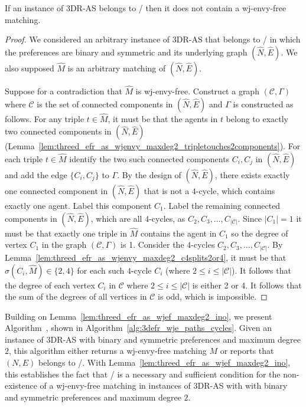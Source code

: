 \begin{lem}
\label{lem:threed_efr_as_wjef_maxdeg2_ino}
If an instance of 3DR-AS belongs to \iwjnomaxdegreetwofamily/ then it does not contain a wj-envy-free matching.
\end{lem}
\begin{proof}
We considered an arbitrary instance of 3DR-AS that belongs to \iwjnomaxdegreetwofamily/ in which the preferences are binary and symmetric and its underlying graph $(\hat{N}, \hat{E})$. We also supposed $\hat{M}$ is an arbitrary matching of $(\hat{N}, \hat{E})$.

Suppose for a contradiction that $\hat{M}$ is wj-envy-free. Construct a graph $(\mathcal{C}, \Gamma)$ where $\mathcal{C}$ is the set of connected components in $(\hat{N}, \hat{E})$ and $\Gamma$ is constructed as follows. For any triple $t \in \hat{M}$, it must be that the agents in $t$ belong to exactly two connected components in $(\hat{N}, \hat{E})$ (Lemma~\ref{lem:threed_efr_as_wjenvy_maxdeg2_tripletouches2components}). For each triple $t \in \hat{M}$ identify the two such connected components $C_i, C_j$ in $(\hat{N}, \hat{E})$ and add the edge $\{ C_i, C_j \}$ to $\Gamma$. By the design of $(\hat{N}, \hat{E})$, there exists exactly one connected component in $(\hat{N}, \hat{E})$ that is not a $4$-cycle, which contains exactly one agent. Label this component $C_1$. Label the remaining connected components in $(\hat{N}, \hat{E})$, which are all $4$-cycles, as $C_2, C_3, \dots, C_{|\mathcal{C}|}$. Since $|C_1|=1$ it must be that exactly one triple in $\hat{M}$ contains the agent in $C_1$ so the degree of vertex $C_1$ in the graph $(\mathcal{C}, \Gamma)$ is 1. Consider the $4$-cycles $C_2, C_3, \dots, C_{|\mathcal{C}|}$. By Lemma~\ref{lem:threed_efr_as_wjenvy_maxdeg2_c4splits2or4}, it must be that $\sigma(C_i, \hat{M}) \in \{ 2, 4 \}$ for each such $4$-cycle $C_i$ (where $2\leq i\leq |\mathcal{C}|$). It follows that the degree of each vertex $C_i$ in $\mathcal{C}$ where $2\leq i\leq |\mathcal{C}|$ is either 2 or 4. It follows that the sum of the degrees of all vertices in $\mathcal{C}$ is odd, which is impossible.
\end{proof}

Building on Lemma~\ref{lem:threed_efr_as_wjef_maxdeg2_ino}, we present Algorithm~, shown in Algorithm~\ref{alg:3defr_wje_paths_cycles}. Given an instance of 3DR-AS with binary and symmetric preferences and maximum degree $2$, this algorithm either returns a wj-envy-free matching $M$ or reports that $(N, E)$ belongs to \iwjnomaxdegreetwofamily/. With Lemma~\ref{lem:threed_efr_as_wjef_maxdeg2_ino}, this establishes the fact that \iwjnomaxdegreetwofamily/ is a necessary and sufficient condition for the non-existence of a wj-envy-free matching in instances of 3DR-AS with with binary and symmetric preferences and maximum degree $2$.

